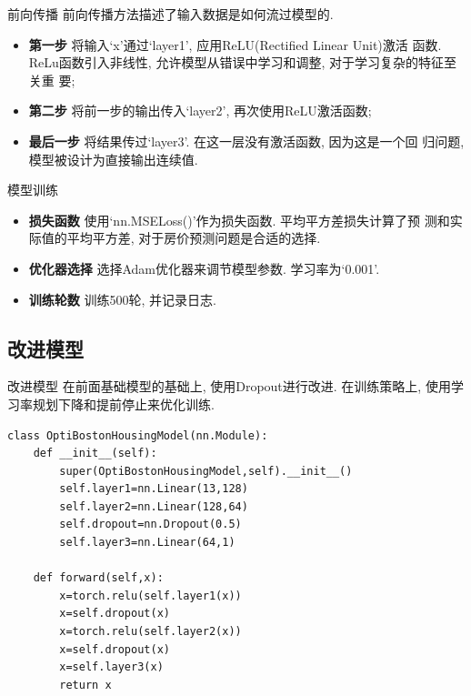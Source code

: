 \documentclass{beamer}
\begin{document}
\begin{frame}[fragile]{前向传播}
	前向传播方法描述了输入数据是如何流过模型的.
	\begin{itemize}
		\item \textbf{第一步 }将输入`x'通过`layer1', 应用ReLU(Rectified Linear Unit)激活
		      函数. ReLu函数引入非线性, 允许模型从错误中学习和调整, 对于学习复杂的特征至关重
		      要;
		\item \textbf{第二步 }将前一步的输出传入`layer2', 再次使用ReLU激活函数;
		\item \textbf{最后一步 }将结果传过`layer3'. 在这一层没有激活函数, 因为这是一个回
		      归问题, 模型被设计为直接输出连续值.
	\end{itemize}
\end{frame}

\begin{frame}[fragile]{模型训练}
	\begin{itemize}
		\item \textbf{损失函数 } 使用`nn.MSELoss()'作为损失函数. 平均平方差损失计算了预
		      测和实际值的平均平方差, 对于房价预测问题是合适的选择.
		\item \textbf{优化器选择 } 选择Adam优化器来调节模型参数. 学习率为`0.001'.
		\item \textbf{训练轮数 } 训练500轮, 并记录日志.
	\end{itemize}
\end{frame}

\subsection{改进模型}

\begin{frame}[fragile]{改进模型}
	在前面基础模型的基础上, 使用Dropout进行改进. 在训练策略上, 使用学习率规划下降和提前停止来优化训练.
	\begin{verbatim}
class OptiBostonHousingModel(nn.Module):
    def __init__(self):
        super(OptiBostonHousingModel,self).__init__()
        self.layer1=nn.Linear(13,128)
        self.layer2=nn.Linear(128,64)
        self.dropout=nn.Dropout(0.5)
        self.layer3=nn.Linear(64,1)
        
    def forward(self,x):
        x=torch.relu(self.layer1(x))
        x=self.dropout(x)
        x=torch.relu(self.layer2(x))
        x=self.dropout(x)
        x=self.layer3(x)
        return x
	\end{verbatim}
\end{frame}
\end{document}
